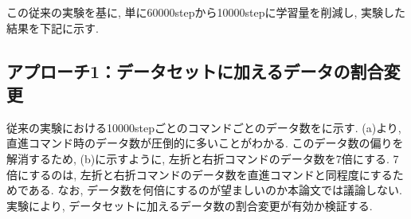 \newpage

この従来の実験を基に, 単に60000stepから10000stepに学習量を削減し, 実験した結果を下記に示す.

\newpage



\subsection{アプローチ1：データセットに加えるデータの割合変更}
従来の実験における10000stepごとのコマンドごとのデータ数をに示す.  (a)より, 直進コマンド時のデータ数が圧倒的に多いことがわかる. このデータ数の偏りを解消するため,  (b)に示すように, 左折と右折コマンドのデータ数を7倍にする. 7倍にするのは, 左折と右折コマンドのデータ数を直進コマンドと同程度にするためである. なお, データ数を何倍にするのが望ましいのか本論文では議論しない. 実験により, データセットに加えるデータ数の割合変更が有効か検証する.



